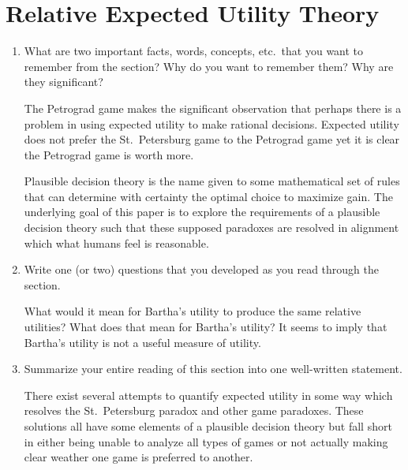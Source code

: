 \documentclass[a4paper, 12pt]{config/homework}
\begin{document}
\section{Relative Expected Utility Theory}
\begin{enumerate}[label=\roman*.]
\item What are two important facts, words, concepts, etc.\ that you want to remember from the section? Why do you want to remember them? Why are they significant?

The Petrograd game makes the significant observation that perhaps there is a problem in using expected utility to make rational decisions. Expected utility does not prefer the St.\ Petersburg game to the Petrograd game yet it is clear the Petrograd game is worth more.

Plausible decision theory is the name given to some mathematical set of rules that can determine with certainty the optimal choice to maximize gain. The underlying goal of this paper is to explore the requirements of a plausible decision theory such that these supposed paradoxes are resolved in alignment which what humans feel is reasonable.

\item Write one (or two) questions that you developed as you read through the section.

What would it mean for Bartha's utility to produce the same relative utilities? What does that mean for Bartha's utility? It seems to imply that Bartha's utility is not a useful measure of utility.

\item Summarize your entire reading of this section into one well-written statement.

There exist several attempts to quantify expected utility in some way which resolves the St.\ Petersburg paradox and other game paradoxes. These solutions all have some elements of a plausible decision theory but fall short in either being unable to analyze all types of games or not actually making clear weather one game is preferred to another.

\end{enumerate}
\end{document}
